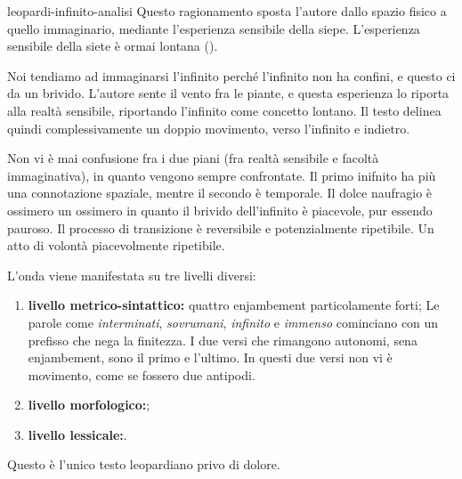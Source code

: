 \documentclass[preview]{standalone}
\begin{document}
\begin{snippet}{leopardi-infinito-analisi}
    Questo ragionamento sposta l'autore dallo spazio fisico a quello immaginario,
    mediante l'esperienza sensibile della siepe.
    L'esperienza sensibile della siete è ormai lontana ().

    Noi tendiamo ad immaginarsi l'infinito perché l'infinito non ha confini, e questo ci da un brivido.
    L'autore sente il vento fra le piante, e questa esperienza lo riporta
    alla realtà sensibile, riportando l'infinito come concetto lontano.
    Il testo delinea quindi complessivamente un doppio movimento,
    verso l'infinito e indietro.

    Non vi è mai confusione fra i due piani (fra realtà sensibile e facoltà immaginativa), in quanto
    vengono sempre confrontate.
    Il primo inifnito ha più una connotazione spaziale, mentre il secondo
    è temporale.
    Il dolce naufragio è ossimero un ossimero in quanto
    il brivido dell'infinito è piacevole, pur essendo pauroso.
    Il processo di transizione è reversibile e potenzialmente ripetibile.
    Un atto di volontà piacevolmente ripetibile.

    L'onda viene manifestata su tre livelli diversi:
    \begin{enumerate}
        \item \textbf{livello metrico-sintattico:} quattro enjambement particolamente forti;
            Le parole come \textit{interminati}, \textit{sovrumani}, \textit{infinito} e \textit{immenso}
            cominciano con un prefisso che nega la finitezza.
            I due versi che rimangono autonomi, sena enjambement,
            sono il primo e l'ultimo.
            In questi due versi non vi è movimento, come se fossero due antipodi.
        \item \textbf{livello morfologico:};
        \item \textbf{livello lessicale:}.
    \end{enumerate}

    Questo è l'unico testo leopardiano privo di dolore.
\end{snippet}
\end{document}
